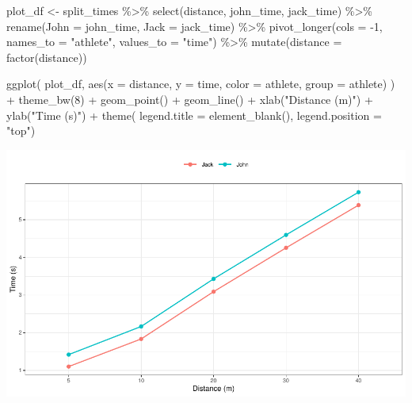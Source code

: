 \documentclass[fleqn,10pt,lineno]{wlpeerj} %
\newenvironment{Shaded}{\begin{snugshade}}{\end{snugshade}}
\newcommand{\AttributeTok}[1]{\textcolor[rgb]{0.77,0.63,0.00}{#1}}
\newcommand{\DecValTok}[1]{\textcolor[rgb]{0.00,0.00,0.81}{#1}}
\newcommand{\FunctionTok}[1]{\textcolor[rgb]{0.00,0.00,0.00}{#1}}
\newcommand{\NormalTok}[1]{#1}
\newcommand{\OtherTok}[1]{\textcolor[rgb]{0.56,0.35,0.01}{#1}}
\newcommand{\SpecialCharTok}[1]{\textcolor[rgb]{0.00,0.00,0.00}{#1}}
\newcommand{\StringTok}[1]{\textcolor[rgb]{0.31,0.60,0.02}{#1}}
\begin{document}
\begin{Shaded}
\begin{Highlighting}[]
\NormalTok{plot\_df }\OtherTok{\textless{}{-}}\NormalTok{ split\_times }\SpecialCharTok{\%\textgreater{}\%}
  \FunctionTok{select}\NormalTok{(distance, john\_time, jack\_time) }\SpecialCharTok{\%\textgreater{}\%}
  \FunctionTok{rename}\NormalTok{(}\AttributeTok{John =}\NormalTok{ john\_time, }\AttributeTok{Jack =}\NormalTok{ jack\_time) }\SpecialCharTok{\%\textgreater{}\%}
  \FunctionTok{pivot\_longer}\NormalTok{(}\AttributeTok{cols =} \SpecialCharTok{{-}}\DecValTok{1}\NormalTok{, }\AttributeTok{names\_to =} \StringTok{"athlete"}\NormalTok{, }\AttributeTok{values\_to =} \StringTok{"time"}\NormalTok{) }\SpecialCharTok{\%\textgreater{}\%}
  \FunctionTok{mutate}\NormalTok{(}\AttributeTok{distance =} \FunctionTok{factor}\NormalTok{(distance))}

\FunctionTok{ggplot}\NormalTok{(}
\NormalTok{  plot\_df,}
  \FunctionTok{aes}\NormalTok{(}\AttributeTok{x =}\NormalTok{ distance, }\AttributeTok{y =}\NormalTok{ time, }\AttributeTok{color =}\NormalTok{ athlete, }\AttributeTok{group =}\NormalTok{ athlete)}
\NormalTok{) }\SpecialCharTok{+}
  \FunctionTok{theme\_bw}\NormalTok{(}\DecValTok{8}\NormalTok{) }\SpecialCharTok{+}
  \FunctionTok{geom\_point}\NormalTok{() }\SpecialCharTok{+}
  \FunctionTok{geom\_line}\NormalTok{() }\SpecialCharTok{+}
  \FunctionTok{xlab}\NormalTok{(}\StringTok{"Distance (m)"}\NormalTok{) }\SpecialCharTok{+}
  \FunctionTok{ylab}\NormalTok{(}\StringTok{"Time (s)"}\NormalTok{) }\SpecialCharTok{+}
  \FunctionTok{theme}\NormalTok{(}
    \AttributeTok{legend.title =} \FunctionTok{element\_blank}\NormalTok{(), }
    \AttributeTok{legend.position =} \StringTok{"top"}\NormalTok{)}
\end{Highlighting}
\end{Shaded}

\begin{center}\includegraphics[width=1\linewidth]{paper_files/figure-latex/unnamed-chunk-30-1} \end{center}
\end{document}
